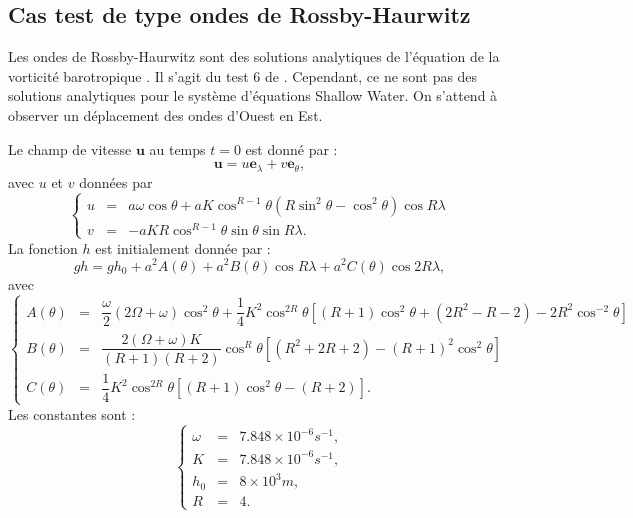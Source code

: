 \subsection{Cas test de type ondes de Rossby-Haurwitz}

Les ondes de Rossby-Haurwitz sont des solutions analytiques de l'équation de la vorticité barotropique \cite{Haurwitz1940, Pedlosky2013}. Il s'agit du test 6 de \cite{Williamson1992}. Cependant, ce ne sont pas des solutions analytiques pour le système d'équations Shallow Water. On s'attend à observer un déplacement des ondes d'Ouest en Est.

Le champ de vitesse $\mathbf{u}$ au temps $t=0$ est donné par :
\begin{equation}
\mathbf{u} = u \mathbf{e}_{\lambda} + v \mathbf{e}_{\theta},
\end{equation}
avec $u$ et $v$ données par
\begin{equation}
\left\lbrace
\begin{array}{rcl}
u & = & a \omega \cos \theta + a K \cos^{R-1} \theta \left( R \sin^2 \theta - \cos^2 \theta \right) \cos R \lambda\\
v & = & - a K R \cos^{R-1} \theta \sin \theta \sin R \lambda.
\end{array}
\right.
\end{equation}
La fonction $h$ est initialement donnée par :
\begin{equation}
gh = gh_0 + a^2 A(\theta) + a^2 B(\theta) \cos R \lambda + a^2 C(\theta) \cos 2 R \lambda,
\end{equation}
avec
\begin{equation}
\left\lbrace
\begin{array}{rcl}
A(\theta) & = & \dfrac{\omega}{2} \left( 2 \Omega + \omega \right) \cos^2 \theta + \dfrac{1}{4} K^2 \cos^{2R} \theta 
\left[ (R+1) \cos^2 \theta+ (2R^2 -R -2) - 2R^2 \cos^{-2} \theta \right]\\
B(\theta) & = & \dfrac{2 (\Omega +\omega) K }{(R+1)(R+2)} \cos^R \theta 
\left[ (R^2 + 2R +2) - (R+1)^2 \cos^2 \theta  \right] \\
C(\theta) & = & \dfrac{1}{4} K^2 \cos^{2R} \theta \left[ (R+1) \cos^2 \theta - (R+2) \right].
\end{array}
\right.
\end{equation}
Les constantes sont :
\begin{equation}
\left\lbrace
\begin{array}{rcl}
\omega & = & 7.848 \times 10^{-6} \si{s^{-1}},\\
K & = & 7.848 \times 10^{-6} \si{s^{-1}},\\
h_0 & = & 8 \times 10^3 \si{m},\\
R & = & 4.
\end{array}
\right.
\end{equation} 

